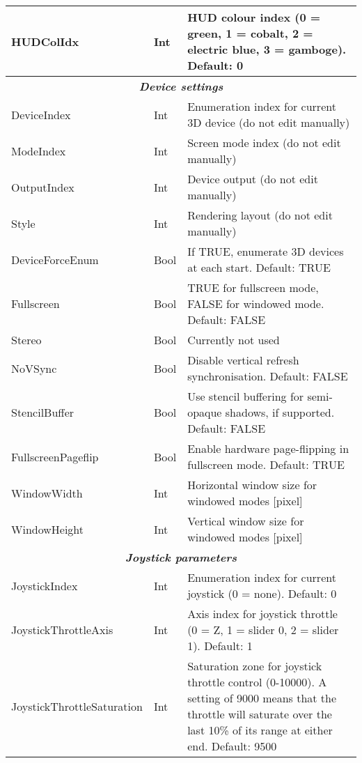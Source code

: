 \documentclass[Orbiter User Manual.tex]{subfiles}
\begin{document}
\begin{longtable}{ |p{}|p{}|p{}| }
	HUDColIdx & Int & HUD colour index (0 = green, 1 = cobalt, 2 = electric blue, 3 = gamboge). Default: 0\\
	\hline
	\multicolumn{3}{|c|}{\rule{0pt}{2ex}\textbf{\textit{Device settings}}}\\
	\hline\rule{0pt}{2ex}
	DeviceIndex & Int & Enumeration index for current 3D device (do not edit manually)\\
	\hline\rule{0pt}{2ex}
	ModeIndex & Int & Screen mode index (do not edit manually)\\
	\hline\rule{0pt}{2ex}
	OutputIndex & Int & Device output (do not edit manually)\\
	\hline\rule{0pt}{2ex}
	Style & Int & Rendering layout (do not edit manually)\\
	\hline\rule{0pt}{2ex}
	DeviceForceEnum & Bool & If TRUE, enumerate 3D devices at each start. Default: TRUE\\
	\hline\rule{0pt}{2ex}
	Fullscreen & Bool & TRUE for fullscreen mode, FALSE for windowed mode. Default: FALSE\\
	\hline\rule{0pt}{2ex}
	Stereo & Bool & Currently not used\\
	\hline\rule{0pt}{2ex}
	NoVSync & Bool & Disable vertical refresh synchronisation. Default: FALSE\\
	\hline\rule{0pt}{2ex}
	StencilBuffer & Bool & Use stencil buffering for semi-opaque shadows, if supported. Default: FALSE\\
	\hline\rule{0pt}{2ex}
	FullscreenPageflip & Bool & Enable hardware page-flipping in fullscreen mode. Default: TRUE\\
	\hline\rule{0pt}{2ex}
	WindowWidth & Int & Horizontal window size for windowed modes [pixel]\\
	\hline\rule{0pt}{2ex}
	WindowHeight & Int & Vertical window size for windowed modes [pixel]\\
	\hline
	\multicolumn{3}{|c|}{\rule{0pt}{2ex}\textbf{\textit{Joystick parameters}}}\\
	\hline\rule{0pt}{2ex}
	JoystickIndex & Int & Enumeration index for current joystick (0 = none). Default: 0\\
	\hline\rule{0pt}{2ex}
	JoystickThrottleAxis & Int & Axis index for joystick throttle (0 = Z, 1 = slider 0, 2 = slider 1). Default: 1\\
	\hline\rule{0pt}{2ex}
	JoystickThrottleSaturation & Int & Saturation zone for joystick throttle control (0-10000). A setting of 9000 means that the throttle will saturate over the last 10\% of its range at either end. Default: 9500\\

\end{longtable}
\end{document}
